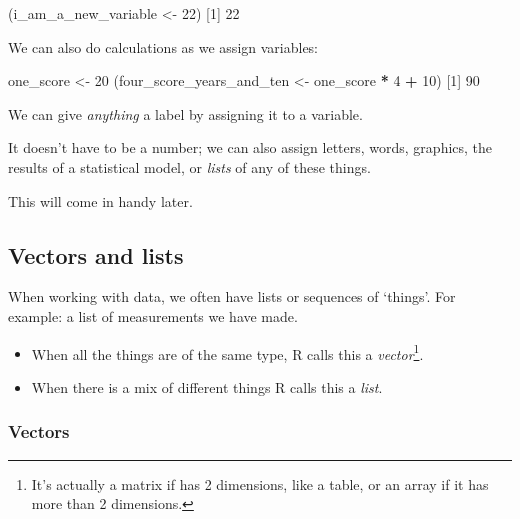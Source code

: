 \documentclass[]{article}
\newenvironment{Shaded}{\begin{snugshade}}{\end{snugshade}}
\newcommand{\DecValTok}[1]{\textcolor[rgb]{0.00,0.00,0.81}{#1}}
\newcommand{\NormalTok}[1]{#1}
\newcommand{\OperatorTok}[1]{\textcolor[rgb]{0.81,0.36,0.00}{\textbf{#1}}}
\newcommand{\StringTok}[1]{\textcolor[rgb]{0.31,0.60,0.02}{#1}}
\let\rmarkdownfootnote\footnote%
\def\footnote{\protect\rmarkdownfootnote}
\begin{document}
\begin{Shaded}
\begin{Highlighting}[]
\NormalTok{(i_am_a_new_variable <-}\StringTok{ }\DecValTok{22}\NormalTok{)}
\NormalTok{[}\DecValTok{1}\NormalTok{] }\DecValTok{22}
\end{Highlighting}
\end{Shaded}

We can also do calculations as we assign variables:

\begin{Shaded}
\begin{Highlighting}[]
\NormalTok{one_score <-}\StringTok{ }\DecValTok{20}
\NormalTok{(four_score_years_and_ten <-}\StringTok{ }\NormalTok{one_score }\OperatorTok{*}\StringTok{ }\DecValTok{4} \OperatorTok{+}\StringTok{ }\DecValTok{10}\NormalTok{)}
\NormalTok{[}\DecValTok{1}\NormalTok{] }\DecValTok{90}
\end{Highlighting}
\end{Shaded}

We can give \emph{anything} a label by assigning it to a variable.

It doesn't have to be a number; we can also assign letters, words, graphics, the
results of a statistical model, or \emph{lists} of any of these things.

This will come in handy later.

\hypertarget{vectors-and-lists}{%
\subsection*{Vectors and lists}\label{vectors-and-lists}}

When working with data, we often have lists or sequences of `things'. For
example: a list of measurements we have made.

\begin{itemize}
\item
  When all the things are of the same type, R calls this a \emph{vector}\footnote{It's
    actually a matrix if has 2 dimensions, like a table, or an array if it has
    more than 2 dimensions.}.
\item
  When there is a mix of different things R calls this a \emph{list}.
\end{itemize}

\hypertarget{vector}{%
\subsubsection*{Vectors}\label{vector}}
\end{document}

